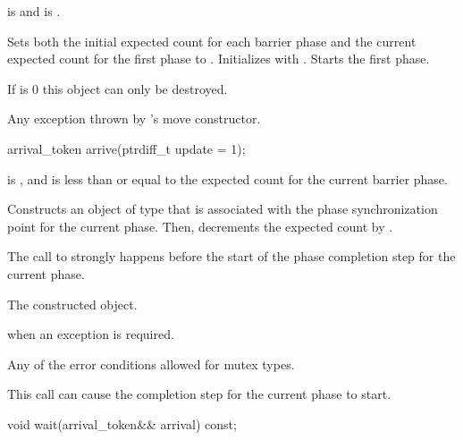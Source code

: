 \begin{itemdescr}
\pnum
\expects
{} is  and
 is .

\pnum
\effects
Sets both the initial expected count for each barrier phase and
the current expected count for the first phase to .
Initializes  with .
Starts the first phase.
\begin{note}
If  is 0 this object can only be destroyed.
\end{note}

\pnum
\throws
Any exception thrown by 's move constructor.
\end{itemdescr}

%
\begin{itemdecl}
arrival_token arrive(ptrdiff_t update = 1);
\end{itemdecl}

\begin{itemdescr}
\pnum
\expects
{} is , and
 is less than or equal to
the expected count for the current barrier phase.

\pnum
\effects
Constructs an object of type 
that is associated with the phase synchronization point for the current phase.
Then, decrements the expected count by .

\pnum
\sync
The call to  strongly happens before
the start of the phase completion step for the current phase.

\pnum
\returns
The constructed  object.

\pnum
\throws
{} when an exception is required.

\pnum
\errors
Any of the error conditions
allowed for mutex types.

\pnum
\begin{note}
This call can cause the completion step for the current phase to start.
\end{note}
\end{itemdescr}

%
\begin{itemdecl}
void wait(arrival_token&& arrival) const;
\end{itemdecl}

